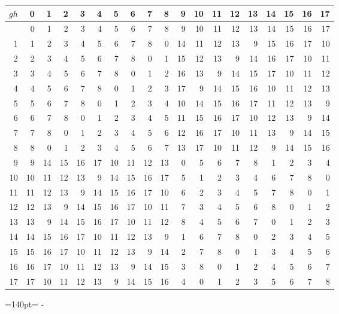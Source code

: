 \documentclass[10pt,a4paper]{article}
\newcommand{\needspace}[1]{\par\penalty-100\begingroup\dimen0=#1\relax\dimen2=\pagegoal
  \advance\dimen2-\pagetotal\ifdim\dimen0>\dimen2\relax\ifdim\dimen2>0pt\vfil\break\fi\fi
  \endgroup}
\numberwithin{equation}{section}
\begin{document}
{\normalsize\setlength{\tabcolsep}{0.1em}\setlength{\LTleft}{-8pt plus 1fill}\setlength{\LTright}{-8pt plus 1fill}\begin{longtable}{@{}r|rrrrrrrrrrrrrrrrrr@{}}\toprule
$gh$ & 0 & 1 & 2 & 3 & 4 & 5 & 6 & 7 & 8 & 9 & 10 & 11 & 12 & 13 & 14 & 15 & 16 & 17\\\midrule\endhead
\bottomrule\endfoot\endlastfoot
0 & 0 & 1 & 2 & 3 & 4 & 5 & 6 & 7 & 8 & 9 & 10 & 11 & 12 & 13 & 14 & 15 & 16 & 17\\*
1 & 1 & 2 & 3 & 4 & 5 & 6 & 7 & 8 & 0 & 14 & 11 & 12 & 13 & 9 & 15 & 16 & 17 & 10\\
2 & 2 & 3 & 4 & 5 & 6 & 7 & 8 & 0 & 1 & 15 & 12 & 13 & 9 & 14 & 16 & 17 & 10 & 11\\
3 & 3 & 4 & 5 & 6 & 7 & 8 & 0 & 1 & 2 & 16 & 13 & 9 & 14 & 15 & 17 & 10 & 11 & 12\\
4 & 4 & 5 & 6 & 7 & 8 & 0 & 1 & 2 & 3 & 17 & 9 & 14 & 15 & 16 & 10 & 11 & 12 & 13\\
5 & 5 & 6 & 7 & 8 & 0 & 1 & 2 & 3 & 4 & 10 & 14 & 15 & 16 & 17 & 11 & 12 & 13 & 9\\
6 & 6 & 7 & 8 & 0 & 1 & 2 & 3 & 4 & 5 & 11 & 15 & 16 & 17 & 10 & 12 & 13 & 9 & 14\\
7 & 7 & 8 & 0 & 1 & 2 & 3 & 4 & 5 & 6 & 12 & 16 & 17 & 10 & 11 & 13 & 9 & 14 & 15\\
8 & 8 & 0 & 1 & 2 & 3 & 4 & 5 & 6 & 7 & 13 & 17 & 10 & 11 & 12 & 9 & 14 & 15 & 16\\
9 & 9 & 14 & 15 & 16 & 17 & 10 & 11 & 12 & 13 & 0 & 5 & 6 & 7 & 8 & 1 & 2 & 3 & 4\\
10 & 10 & 11 & 12 & 13 & 9 & 14 & 15 & 16 & 17 & 5 & 1 & 2 & 3 & 4 & 6 & 7 & 8 & 0\\
11 & 11 & 12 & 13 & 9 & 14 & 15 & 16 & 17 & 10 & 6 & 2 & 3 & 4 & 5 & 7 & 8 & 0 & 1\\
12 & 12 & 13 & 9 & 14 & 15 & 16 & 17 & 10 & 11 & 7 & 3 & 4 & 5 & 6 & 8 & 0 & 1 & 2\\
13 & 13 & 9 & 14 & 15 & 16 & 17 & 10 & 11 & 12 & 8 & 4 & 5 & 6 & 7 & 0 & 1 & 2 & 3\\
14 & 14 & 15 & 16 & 17 & 10 & 11 & 12 & 13 & 9 & 1 & 6 & 7 & 8 & 0 & 2 & 3 & 4 & 5\\
15 & 15 & 16 & 17 & 10 & 11 & 12 & 13 & 9 & 14 & 2 & 7 & 8 & 0 & 1 & 3 & 4 & 5 & 6\\
16 & 16 & 17 & 10 & 11 & 12 & 13 & 9 & 14 & 15 & 3 & 8 & 0 & 1 & 2 & 4 & 5 & 6 & 7\\*
17 & 17 & 10 & 11 & 12 & 13 & 9 & 14 & 15 & 16 & 4 & 0 & 1 & 2 & 3 & 5 & 6 & 7 & 8\\
\bottomrule\end{longtable}}
\needspace{140pt}
\end{document}
